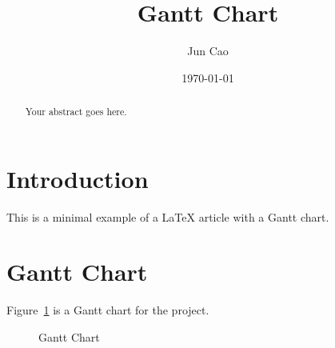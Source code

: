 \documentclass[12pt]{article}
\title{Gantt Chart}
\author{Jun Cao}
\date{\today}
\begin{document}
\maketitle

\begin{abstract}
Your abstract goes here.
\end{abstract}

\section{Introduction}
This is a minimal example of a LaTeX article with a Gantt chart.

\section{Gantt Chart}
Figure~\ref{fig:gantt} is a Gantt chart for the project.

\begin{figure}[htbp]
    \centering
    \resizebox{\textwidth}{!}{%
    }
    \caption{Gantt Chart}\label{fig:gantt}
\end{figure}
\end{document}
